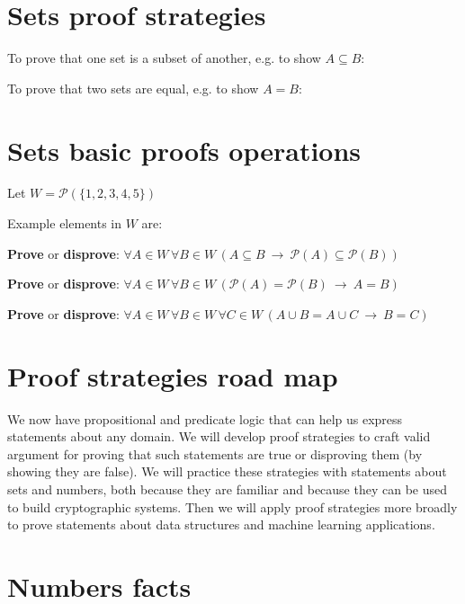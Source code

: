 \documentclass[12pt, oneside]{article}
\begin{document}
\vfill
 \vfill
\section*{Sets proof strategies}


To prove that one set is a subset of another, e.g. to show $A \subseteq B$:

\vspace{50pt}

To prove that two sets are equal, e.g. to show $A = B$:

\vspace{50pt}
 \vfill
\section*{Sets basic proofs operations}


Let $W =  \mathcal{P}(  \{ 1,2,3,4,5\} )$

Example elements in $W$ are:
\vspace{20pt}


{\bf Prove} or {\bf  disprove}:  $\forall  A \in W\,  \forall B \in W\,  \left( A \subseteq B
~\to ~ \mathcal{P}(A) \subseteq \mathcal{P}(B) \right)$

\vfill
\vfill
\vfill

{\bf Prove} or {\bf  disprove}:  $\forall  A \in W\,  \forall B \in W\,  \left( \mathcal{P}(A)  =\mathcal{P}(B)
~\to ~ A = B \right)$

\vfill
\vfill

{\bf Prove} or {\bf  disprove}:  $\forall  A \in W\,  \forall B \in W\, \forall C  \in W\,  \left( A\cup B  = A \cup  C
~\to ~ B = C \right)$

\vfill
\vfill \vfill
\section*{Proof strategies road map}


We now have propositional and predicate logic that can help us express 
statements about any domain. We will develop proof strategies to 
craft valid argument for proving that such statements are true or disproving
them (by showing they are false). We will practice these strategies with 
statements about sets and numbers, both because they are familiar and because they
can be used to build cryptographic systems. Then we will apply proof strategies
more broadly to prove statements about data structures and machine learning 
applications. \vfill
\section*{Numbers facts}
\end{document}
